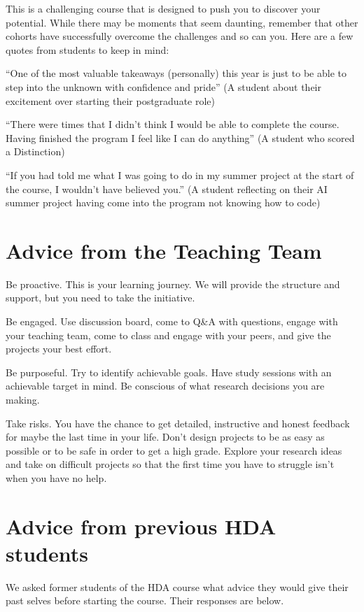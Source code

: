 \documentclass[
]{book}
\begin{document}
This is a challenging course that is designed to push you to discover your potential. While there may be moments that seem daunting, remember that other cohorts have successfully overcome the challenges and so can you. Here are a few quotes from students to keep in mind:

``One of the most valuable takeaways (personally) this year is just to be able to step into the unknown with confidence and pride'' (A student about their excitement over starting their postgraduate role)

``There were times that I didn't think I would be able to complete the course. Having finished the program I feel like I can do anything'' (A student who scored a Distinction)

``If you had told me what I was going to do in my summer project at the start of the course, I wouldn't have believed you.'' (A student reflecting on their AI summer project having come into the program not knowing how to code)

\section{Advice from the Teaching Team}\label{advice-from-the-teaching-team}

Be proactive. This is your learning journey. We will provide the structure and support, but you need to take the initiative.

Be engaged. Use discussion board, come to Q\&A with questions, engage with your teaching team, come to class and engage with your peers, and give the projects your best effort.

Be purposeful. Try to identify achievable goals. Have study sessions with an achievable target in mind. Be conscious of what research decisions you are making.

Take risks. You have the chance to get detailed, instructive and honest feedback for maybe the last time in your life. Don't design projects to be as easy as possible or to be safe in order to get a high grade. Explore your research ideas and take on difficult projects so that the first time you have to struggle isn't when you have no help.

\section{Advice from previous HDA students}\label{advice-from-previous-hda-students}

We asked former students of the HDA course what advice they would give their past selves before starting the course. Their responses are below.
\end{document}
